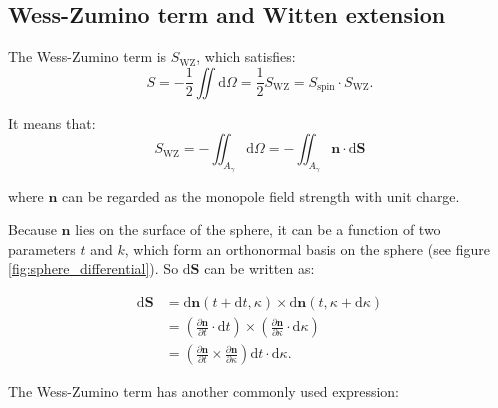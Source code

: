 

\subsection{Wess-Zumino term and Witten extension}

The Wess-Zumino term is $S_{\mathrm{WZ}}$, which satisfies:
\begin{equation}
S = - \frac{1}{2} \iint \mathrm{d}\Omega = \frac{1}{2} S_{\mathrm{WZ}} = S_{\mathrm{spin}} \cdot S_{\mathrm{WZ}}.
\end{equation}

It means that:
\begin{equation}
S_{\mathrm{WZ}} = -\iint_{A_{\gamma}} \mathrm{d}\Omega = - \iint_{A_{\gamma}} \bm{n} \cdot \mathrm{d}\bm{S}
\end{equation}

where $\bm{n}$ can be regarded as the monopole field strength with unit charge.



Because $\bm{n}$ lies on the surface of the sphere,
it can be a function of two parameters $t$ and $k$,
which form an orthonormal basis on the sphere (see figure \ref{fig:sphere_differential}).
So $\mathrm{d}\bm{S}$ can be written as:

\begin{equation}
\begin{aligned}
\mathrm{d}\bm{S} &= \mathrm{d}\bm{n}(t + \mathrm{d}t, \kappa) \times \mathrm{d}\bm{n}(t, \kappa+\mathrm{d}\kappa) \\
&= (\frac{\partial \bm{n}}{\partial t} \cdot \mathrm{d}t) \times (\frac{\partial \bm{n}}{\partial \kappa} \cdot \mathrm{d}\kappa) \\
&= (\frac{\partial \bm{n}}{\partial t} \times \frac{\partial \bm{n}}{\partial \kappa}) \mathrm{d}t \cdot \mathrm{d}\kappa.
\end{aligned}
\end{equation}



The Wess-Zumino term has another commonly used expression:

